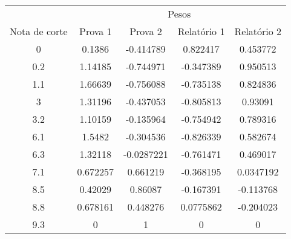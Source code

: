 \begin{tabular}{c cccc}
        \hline
                      & \multicolumn{4}{c}{Pesos}\\ \cline{2-5}
        Nota de corte & Prova 1  & Prova 2 & Relatório 1
        & Relatório 2 \\
        \hline
        0    & 0.1386   & -0.414789  & 0.822417  & 0.453772  \\
        0.2  & 1.14185  & -0.744971  & -0.347389 & 0.950513  \\
        1.1  & 1.66639  & -0.756088  & -0.735138 & 0.824836  \\
        3    & 1.31196  & -0.437053  & -0.805813 & 0.93091   \\
        3.2  & 1.10159  & -0.135964  & -0.754942 & 0.789316  \\
        6.1  & 1.5482   & -0.304536  & -0.826339 & 0.582674  \\
        6.3  & 1.32118  & -0.0287221 & -0.761471 & 0.469017  \\
        7.1  & 0.672257 & 0.661219   & -0.368195 & 0.0347192 \\
        8.5  & 0.42029  & 0.86087    & -0.167391 & -0.113768 \\
        8.8  & 0.678161 & 0.448276   & 0.0775862 & -0.204023 \\
        9.3  & 0        & 1          & 0         & 0         \\
        \hline
\end{tabular}
